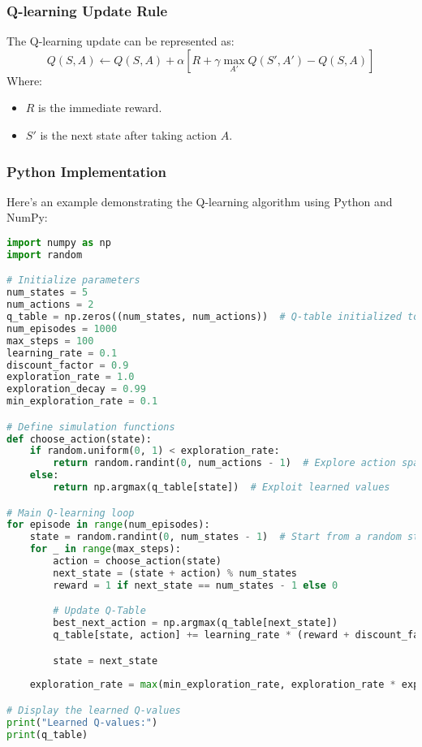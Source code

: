 \documentclass[aspectratio=169]{beamer}
\begin{document}
\begin{frame}[fragile]
    \frametitle{Q-learning Update Rule}
    The Q-learning update can be represented as:
    \begin{equation}
        Q(S, A) \leftarrow Q(S, A) + \alpha \left[ R + \gamma \max_{A'} Q(S', A') - Q(S, A) \right]
    \end{equation}
    Where:
    \begin{itemize}
        \item $R$ is the immediate reward.
        \item $S'$ is the next state after taking action $A$.
    \end{itemize}
\end{frame}

\begin{frame}[fragile]
    \frametitle{Python Implementation}
    Here’s an example demonstrating the Q-learning algorithm using Python and NumPy:
    \begin{lstlisting}[language=Python]
import numpy as np
import random

# Initialize parameters
num_states = 5
num_actions = 2
q_table = np.zeros((num_states, num_actions))  # Q-table initialized to zero
num_episodes = 1000
max_steps = 100
learning_rate = 0.1
discount_factor = 0.9
exploration_rate = 1.0
exploration_decay = 0.99
min_exploration_rate = 0.1 

# Define simulation functions
def choose_action(state):
    if random.uniform(0, 1) < exploration_rate:
        return random.randint(0, num_actions - 1)  # Explore action space
    else:
        return np.argmax(q_table[state])  # Exploit learned values

# Main Q-learning loop
for episode in range(num_episodes):
    state = random.randint(0, num_states - 1)  # Start from a random state
    for _ in range(max_steps):
        action = choose_action(state)
        next_state = (state + action) % num_states
        reward = 1 if next_state == num_states - 1 else 0 

        # Update Q-Table
        best_next_action = np.argmax(q_table[next_state])
        q_table[state, action] += learning_rate * (reward + discount_factor * q_table[next_state, best_next_action] - q_table[state, action])

        state = next_state
        
    exploration_rate = max(min_exploration_rate, exploration_rate * exploration_decay)

# Display the learned Q-values
print("Learned Q-values:")
print(q_table)
    \end{lstlisting}
\end{frame}
\end{document}
